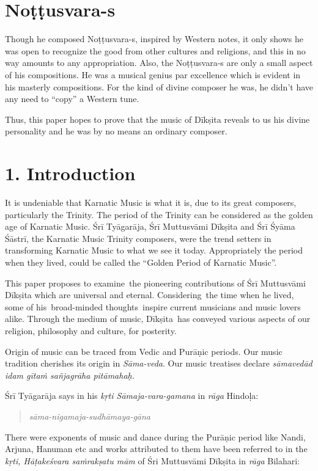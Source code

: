 \section*{Noṭṭusvara-s}

Though he composed Noṭṭusvara-s, inspired by Western notes, it only shows he was open to recognize the good from other cultures and religions, and this in no way amounts to any appropriation. Also, the Noṭṭusvara-s are only a small aspect of his compositions. He was a musical genius par excellence which is evident in his masterly compositions. For the kind of divine composer he was, he didn’t have any need to “copy” a Western tune.

Thus, this paper hopes to prove that the music of Dīkṣita reveals to us his divine personality and he was by no means an ordinary composer.


\section*{1. Introduction}

It is undeniable that Karnatic Music is what it is, due to its great composers, particularly the Trinity. The period of the Trinity can be considered as the golden age of Karnatic Music. Śrī Tyāgarāja, Śrī Muttusvāmi Dīkṣita and Śrī Śyāma Śāstrī, the Karnatic Music Trinity composers, were the trend setters in transforming Karnatic Music to what we see it today. Appropriately the period when they lived, could be called the “Golden Period of Karnatic Music”. 

This paper proposes to examine the pioneering contributions of Śrī Muttusvāmi Dīkṣita which are universal and eternal. Considering the time when he lived, some of his broad-minded thoughts inspire current musicians and music lovers alike. Through the medium of music, Dīkṣita has conveyed various aspects of our religion, philosophy and culture, for posterity. 

Origin of music can be traced from Vedic and Purāṇic periods. Our music tradition cherishes its origin in \textit{Sāma-veda}. Our music treatises declare \textit{sāmavedād idam gītaṁ sañjagrāha pitāmahaḥ.}

Śrī Tyāgarāja says in his \textit{kṛti Sāmaja-vara-gamana} in \textit{rāga} Hindoḷa:

\begin{verse}
\textit{sāma-nigamaja-sudhāmaya-gāna}
\end{verse}

There were exponents of music and dance during the Purāṇic period like Nandi, Arjuna, Hanuman etc and works attributed to them have been referred to in the \textit{kṛti, Hāṭakeśvara saṁrakṣatu mām} of Śri Muttusvāmi Dīkṣita in \textit{rāga} Bilahari:

